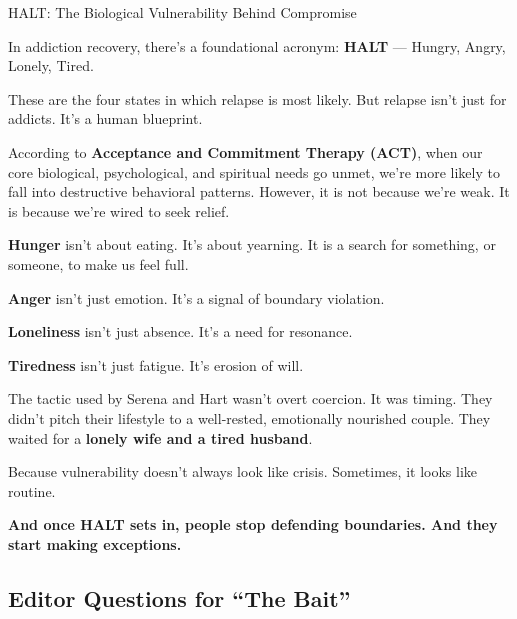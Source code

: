 \begin{TechnicalSidebar}{HALT: The Biological Vulnerability Behind Compromise}

  In addiction recovery, there’s a foundational acronym: \textbf{HALT} — Hungry, Angry, Lonely, Tired.

  \medskip
  
  These are the four states in which relapse is most likely.  
  But relapse isn’t just for addicts. It’s a human blueprint.
  
  \medskip
  
  According to \textbf{Acceptance and Commitment Therapy (ACT)}, when our core biological, psychological, 
  and spiritual needs go unmet, we’re 
  more likely to fall into destructive behavioral patterns. However, it is not because we’re weak. 
  It is because we’re wired to seek relief.  
  
  \medskip
  
  \textbf{Hunger} isn’t about eating. It’s about yearning.
  It is a search for something, or someone, to make us feel full.

  \medskip

  \textbf{Anger} isn’t just emotion. It’s a signal of boundary violation.  

  \medskip

  \textbf{Loneliness} isn’t just absence. It’s a need for resonance.  

  \medskip

  \textbf{Tiredness} isn’t just fatigue. It’s erosion of will.
  
  \medskip
  
  The tactic used by Serena and Hart wasn’t overt coercion. It was timing.  
  They didn’t pitch their lifestyle to a well-rested, emotionally nourished couple.  
  They waited for a \textbf{lonely wife and a tired husband}.

  \medskip
  
  Because vulnerability doesn’t always look like crisis.  
  Sometimes, it looks like routine.
  
  \medskip
  
  \textbf{And once HALT sets in, people stop defending boundaries. And they start making exceptions.}

\end{TechnicalSidebar}



\subsection{Editor Questions for ``The Bait''}

